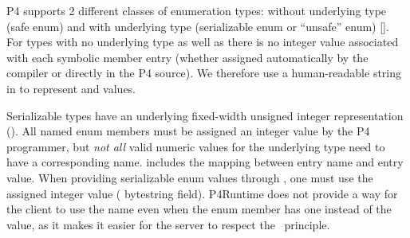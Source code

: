 \documentclass[11pt]{article}
\begin{document}
{%
\noindent{}P4 supports 2 different classes of enumeration types: without underlying
type (safe enum) and with underlying type (serializable enum or \textquotedblleft{}unsafe\textquotedblright{} enum)
[]. For  types with no underlying type \textemdash{} as well as  \textemdash{}
there is no integer value associated with each symbolic member entry (whether
assigned automatically by the compiler or directly in the P4 source). We
therefore use a human-readable string in  to represent  and
 values.%

Serializable  types have an underlying fixed-width unsigned integer
representation (). All named enum members must be assigned an integer
value by the P4 programmer, but \emph{not all} valid numeric values for the
underlying type need to have a corresponding name.  includes the
mapping between entry name and entry value. When providing serializable enum
values through , one must use the assigned integer value (
bytestring field). P4Runtime does not provide a way for the client to use the
name \textemdash{} even when the enum member has one \textemdash{} instead of the value, as it makes
it easier for the server to respect the~ principle.%

}
\end{document}
